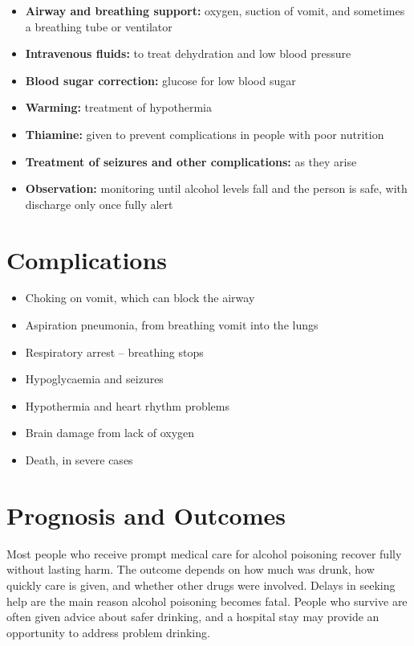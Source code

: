 \begin{itemize}
    \item \textbf{Airway and breathing support:} oxygen, suction of vomit, and sometimes a breathing tube or ventilator
    \item \textbf{Intravenous fluids:} to treat dehydration and low blood pressure
    \item \textbf{Blood sugar correction:} glucose for low blood sugar
    \item \textbf{Warming:} treatment of hypothermia
    \item \textbf{Thiamine:} given to prevent complications in people with poor nutrition
    \item \textbf{Treatment of seizures and other complications:} as they arise
    \item \textbf{Observation:} monitoring until alcohol levels fall and the person is safe, with discharge only once fully alert
\end{itemize}

\section*{Complications}
\begin{itemize}
    \item Choking on vomit, which can block the airway
    \item Aspiration pneumonia, from breathing vomit into the lungs
    \item Respiratory arrest -- breathing stops
    \item Hypoglycaemia and seizures
    \item Hypothermia and heart rhythm problems
    \item Brain damage from lack of oxygen
    \item Death, in severe cases
\end{itemize}

\section*{Prognosis and Outcomes}
Most people who receive prompt medical care for alcohol poisoning recover fully without lasting harm. The outcome depends on how much was drunk, how quickly care is given, and whether other drugs were involved. Delays in seeking help are the main reason alcohol poisoning becomes fatal. People who survive are often given advice about safer drinking, and a hospital stay may provide an opportunity to address problem drinking.

